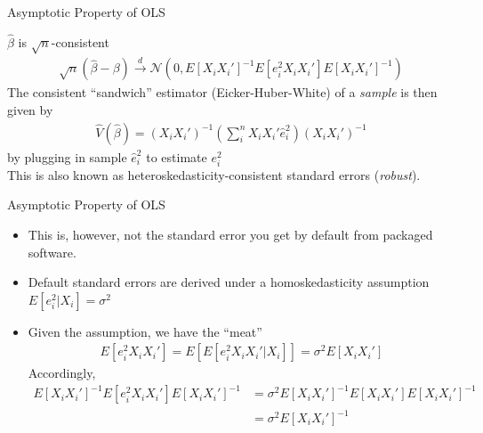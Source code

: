 \documentclass[aspectratio=1610,12pt,xcolor=dvipsnames]{beamer}
\begin{document}
\begin{frame}{Asymptotic Property of OLS}

$\hat \beta$ is $\sqrt{n}$-consistent
\begin{align*}
    \sqrt{n}(\hat{\beta}-\beta) \xrightarrow{d} \mathcal{N}\left( 0, E[X_iX_i']^{-1}E[e_i^2 X_i X_i'] E[X_iX_i']^{-1} \right)
\end{align*}
The consistent ``sandwich'' estimator (Eicker-Huber-White) of a \textit{sample} is then given by
\begin{align*}
    \hat{V}(\hat{\beta}) = (X_iX_i')^{-1}\left( \sum_i^{n} X_iX_i'\hat{e}_i^{2} \right) (X_iX_i')^{-1}
\end{align*}
by plugging in sample $\hat e_i^2$ to estimate $e_i^2$ \\[5pt]

This is also known as heteroskedasticity-consistent standard errors (\textit{robust}).
\end{frame}

\begin{frame}{Asymptotic Property of OLS}

\begin{itemize}
    \item This is, however, not the standard error you get by default from packaged software.
    \item Default standard errors are derived under a homoskedasticity assumption $E[e_i^2|X_i]=\sigma^2$
    \item Given the assumption, we have the ``meat''
    \begin{align*}
        E[e_i^2X_iX_i'] = E[E[e_i^2X_iX_i' | X_i]] = \sigma^2E[X_iX_i']
    \end{align*}
    Accordingly, 
    \begin{align*}
        E[X_iX_i']^{-1}E[e_i^2 X_i X_i'] E[X_iX_i']^{-1} &= \sigma^2 E[X_iX_i']^{-1}E[X_i X_i'] E[X_iX_i']^{-1} \\
        &= \sigma^2E[X_iX_i']^{-1}
    \end{align*}
\end{itemize} 
\end{frame}
\end{document}
